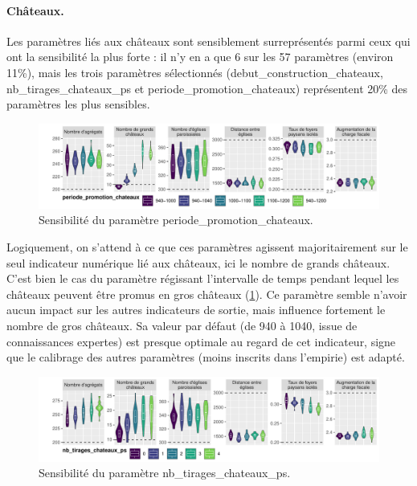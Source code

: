 
\paragraph{Châteaux.}
Les paramètres liés aux châteaux sont sensiblement surreprésentés parmi ceux qui ont la sensibilité la plus forte : il n'y en a que 6 sur les 57 paramètres (environ 11\%), mais les trois paramètres sélectionnés (\textsf{debut\_construction\_chateaux}, \textsf{nb\_tirages\_chateaux\_ps} et \textsf{periode\_promotion\_chateaux}) représentent 20\% des paramètres les plus sensibles.

\begin{figure}[H]
	\centering
	\includegraphics[width=\linewidth]{img/sensib/sensibilite_periode_promotion_chateaux.pdf}
	\caption{Sensibilité du paramètre \textsf{periode\_promotion\_chateaux}.}
	\label{fig:sensib-chateaux-1}
\end{figure}

Logiquement, on s'attend à ce que ces paramètres agissent majoritairement sur le seul indicateur numérique lié aux châteaux, ici le nombre de grands châteaux.
C'est bien le cas du paramètre régissant l'intervalle de temps pendant lequel les châteaux peuvent être promus en gros châteaux (\cref{fig:sensib-chateaux-1}).
Ce paramètre semble n'avoir aucun impact sur les autres indicateurs de sortie, mais influence fortement le nombre de gros châteaux.
Sa valeur par défaut (de 940 à 1040, issue de connaissances expertes) est presque optimale au regard de cet indicateur, signe que le calibrage des autres paramètres (moins inscrits dans l'empirie) est adapté.

\begin{figure}[H]
	\centering
	\includegraphics[width=\linewidth]{img/sensib/sensibilite_nb_tirages_chateaux_ps.pdf}
	\caption{Sensibilité du paramètre \textsf{nb\_tirages\_chateaux\_ps}.}
	\label{fig:sensib-chateaux-2}
\end{figure}

